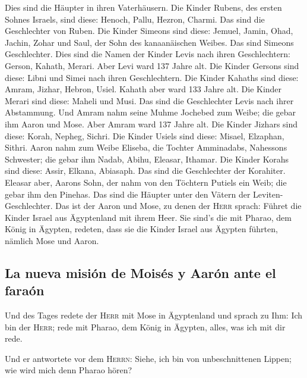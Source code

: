  Dies sind die Häupter in ihren Vaterhäusern. Die Kinder
Rubens, des ersten Sohnes Israels, sind diese: Henoch, Pallu, Hezron,
Charmi. Das sind die Geschlechter von Ruben.  Die Kinder
Simeons sind diese: Jemuel, Jamin, Ohad, Jachin, Zohar und Saul, der
Sohn des kanaanäischen Weibes. Das sind Simeons Geschlechter.
 Dies sind die Namen der Kinder Levis nach ihren
Geschlechtern: Gerson, Kahath, Merari. Aber Levi ward 137 Jahre alt.
 Die Kinder Gersons sind diese: Libni und Simei nach
ihren Geschlechtern.  Die Kinder Kahaths sind diese:
Amram, Jizhar, Hebron, Usiel. Kahath aber ward 133 Jahre alt.
 Die Kinder Merari sind diese: Maheli und Musi. Das sind
die Geschlechter Levis nach ihrer Abstammung.  Und Amram
nahm seine Muhme Jochebed zum Weibe; die gebar ihm Aaron und Mose. Aber
Amram ward 137 Jahre alt.  Die Kinder Jizhars sind diese:
Korah, Nepheg, Sichri.  Die Kinder Usiels sind diese:
Misael, Elzaphan, Sithri.  Aaron nahm zum Weibe Eliseba,
die Tochter Amminadabs, Nahessons Schwester; die gebar ihm Nadab, Abihu,
Eleasar, Ithamar.  Die Kinder Korahs sind diese: Assir,
Elkana, Abiasaph. Das sind die Geschlechter der Korahiter.
 Eleasar aber, Aarons Sohn, der nahm von den Töchtern
Putiels ein Weib; die gebar ihm den Pinehas. Das sind die Häupter unter
den Vätern der Leviten-Geschlechter.  Das ist der Aaron
und Mose, zu denen der \textsc{Herr} sprach: Führet die Kinder Israel
aus Ägyptenland mit ihrem Heer.  Sie sind's die mit
Pharao, dem König in Ägypten, redeten, dass sie die Kinder Israel aus
Ägypten führten, nämlich Mose und Aaron.

\hypertarget{la-nueva-misiuxf3n-de-moisuxe9s-y-aaruxf3n-ante-el-farauxf3n}{%
\subsection{La nueva misión de Moisés y Aarón ante el
faraón}\label{la-nueva-misiuxf3n-de-moisuxe9s-y-aaruxf3n-ante-el-farauxf3n}}

 Und des Tages redete der \textsc{Herr} mit Mose in
Ägyptenland  und sprach zu Ihm: Ich bin der
\textsc{Herr}; rede mit Pharao, dem König in Ägypten, alles, was ich mit
dir rede.

 Und er antwortete vor dem \textsc{Herrn}: Siehe, ich bin
von unbeschnittenen Lippen; wie wird mich denn Pharao hören?


